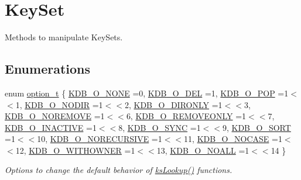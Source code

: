 \hypertarget{group__keyset}{}\section{Key\+Set}
\label{group__keyset}


Methods to manipulate Key\+Sets.  


\subsection*{Enumerations}
\begin{DoxyCompactItemize}
\item 
enum \hyperlink{group__keyset_ga98a3d6a4016c9dad9cbd1a99a9c2a45a}{option\+\_\+t} \{ \newline
\hyperlink{group__keyset_gga98a3d6a4016c9dad9cbd1a99a9c2a45aa00738455e0ae843c8720809d8287f370}{K\+D\+B\+\_\+\+O\+\_\+\+N\+O\+NE} =0, 
\hyperlink{group__keyset_gga98a3d6a4016c9dad9cbd1a99a9c2a45aa66a5380c120f25f28f49848c4a863ead}{K\+D\+B\+\_\+\+O\+\_\+\+D\+EL} =1, 
\hyperlink{group__keyset_gga98a3d6a4016c9dad9cbd1a99a9c2a45aa52fb5f2cc86773d393da62bebebf7984}{K\+D\+B\+\_\+\+O\+\_\+\+P\+OP} =1$<$$<$1, 
\hyperlink{group__keyset_gga98a3d6a4016c9dad9cbd1a99a9c2a45aa1a70738b2126badb8db7b012c8a1c610}{K\+D\+B\+\_\+\+O\+\_\+\+N\+O\+D\+IR} =1$<$$<$2, 
\newline
\hyperlink{group__keyset_gga98a3d6a4016c9dad9cbd1a99a9c2a45aa131e99d60253d0b887a1e5886f8aa96c}{K\+D\+B\+\_\+\+O\+\_\+\+D\+I\+R\+O\+N\+LY} =1$<$$<$3, 
\hyperlink{group__keyset_gga98a3d6a4016c9dad9cbd1a99a9c2a45aa7649f575c2eb0adeaf2c9173ae16e0e6}{K\+D\+B\+\_\+\+O\+\_\+\+N\+O\+R\+E\+M\+O\+VE} =1$<$$<$6, 
\hyperlink{group__keyset_gga98a3d6a4016c9dad9cbd1a99a9c2a45aaf6ed09cee8aa8cf0d6a0e318a7105440}{K\+D\+B\+\_\+\+O\+\_\+\+R\+E\+M\+O\+V\+E\+O\+N\+LY} =1$<$$<$7, 
\hyperlink{group__keyset_gga98a3d6a4016c9dad9cbd1a99a9c2a45aa789926d8a8e15b029cf7dded4154bcda}{K\+D\+B\+\_\+\+O\+\_\+\+I\+N\+A\+C\+T\+I\+VE} =1$<$$<$8, 
\newline
\hyperlink{group__keyset_gga98a3d6a4016c9dad9cbd1a99a9c2a45aaa7d5265eacbb1590982b718f35443e2e}{K\+D\+B\+\_\+\+O\+\_\+\+S\+Y\+NC} =1$<$$<$9, 
\hyperlink{group__keyset_gga98a3d6a4016c9dad9cbd1a99a9c2a45aad9d03b36ee88ca5a774cc01b190c99b8}{K\+D\+B\+\_\+\+O\+\_\+\+S\+O\+RT} =1$<$$<$10, 
\hyperlink{group__keyset_gga98a3d6a4016c9dad9cbd1a99a9c2a45aa6adaa17b267027ce50e670bf8cc6e824}{K\+D\+B\+\_\+\+O\+\_\+\+N\+O\+R\+E\+C\+U\+R\+S\+I\+VE} =1$<$$<$11, 
\hyperlink{group__keyset_gga98a3d6a4016c9dad9cbd1a99a9c2a45aaa5586d229e048f816bf7982765442b86}{K\+D\+B\+\_\+\+O\+\_\+\+N\+O\+C\+A\+SE} =1$<$$<$12, 
\newline
\hyperlink{group__keyset_gga98a3d6a4016c9dad9cbd1a99a9c2a45aab2ff402f5de9aa67b7f786fb715a7a31}{K\+D\+B\+\_\+\+O\+\_\+\+W\+I\+T\+H\+O\+W\+N\+ER} =1$<$$<$13, 
\hyperlink{group__keyset_gga98a3d6a4016c9dad9cbd1a99a9c2a45aae8dd1961707e7d0c27228a3f98b0a94d}{K\+D\+B\+\_\+\+O\+\_\+\+N\+O\+A\+LL} =1$<$$<$14
 \}\begin{DoxyCompactList}\small\item\em Options to change the default behavior of \hyperlink{group__keyset_gaa34fc43a081e6b01e4120daa6c112004}{ks\+Lookup()} functions. \end{DoxyCompactList}
\end{DoxyCompactItemize}
